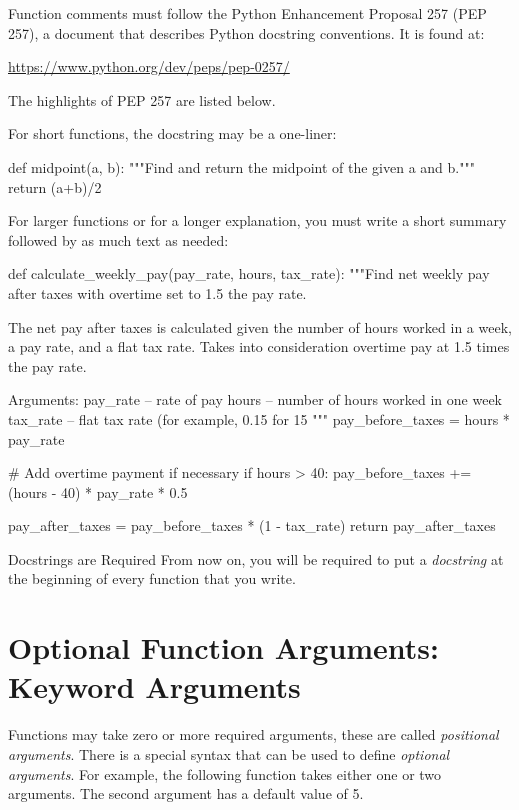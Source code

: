 \documentclass[11pt]{cselabheader}
\begin{document}
Function comments must follow the Python Enhancement Proposal 257 (PEP
257), a document that describes Python docstring conventions. It is
found at:

\begin{center}
  \url{https://www.python.org/dev/peps/pep-0257/}
\end{center}

The highlights of PEP 257 are listed below.

For short functions, the docstring may be a one-liner:

\begin{python3code}
def midpoint(a, b):
    """Find and return the midpoint of the given a and b."""
    return (a+b)/2
\end{python3code}

For larger functions or for a longer explanation, you must write a
short summary followed by as much text as needed:

\begin{python3code}
def calculate_weekly_pay(pay_rate, hours, tax_rate):
    """Find net weekly pay after taxes with overtime set to 1.5 the pay rate.

    The net pay after taxes is calculated given the number of hours worked in a
    week, a pay rate, and a flat tax rate. Takes into consideration overtime pay
    at 1.5 times the pay rate.

    Arguments:
    pay_rate -- rate of pay
    hours -- number of hours worked in one week
    tax_rate -- flat tax rate (for example, 0.15 for 15%
    """
    pay_before_taxes = hours * pay_rate

    # Add overtime payment if necessary
    if hours > 40:
        pay_before_taxes += (hours - 40) * pay_rate * 0.5

    pay_after_taxes = pay_before_taxes * (1 - tax_rate)
    return pay_after_taxes
\end{python3code}

\begin{warningbox}{Docstrings are Required}
From now on, you will be required to put a \emph{docstring} at the beginning
of every function that you write.
\end{warningbox}


\section{Optional Function Arguments: Keyword Arguments}

Functions may take zero or more required arguments, these
are called \textsl{positional arguments}.
There is a special syntax that can be used to define \textsl{optional
arguments}.
For example, the following function takes either one or two arguments. The
second argument has a default value of 5.
\end{document}
